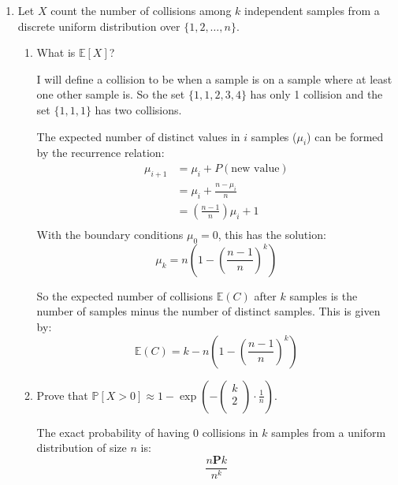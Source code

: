 \documentclass[10pt,\jkfside,a4paper]{article}
\begin{document}
\begin{enumerate}

\item Let $X$ count the number of collisions among $k$ independent samples from a discrete uniform distribution over
$\{1, 2, \ldots, n\}$.

\begin{enumerate}

\item What is $\mathbb{E}[X]$?

I will define a collision to be when a sample is on a sample where at least one other sample is.
So the set $\{1, 1, 2, 3, 4\}$ has only 1 collision and the set $\{1, 1, 1\}$ has two collisions.

The expected number of distinct values in $i$ samples ($\mu_i$) can be formed by the recurrence relation:
\[
\begin{split}
\mu_{i + 1} &= \mu_i + P(\text{new value}) \\
&= \mu_i + \frac{n - \mu_i}{n} \\
&= \left( \frac{n - 1}{n} \right)\mu_i + 1 \\
\end{split}
\]
With the boundary conditions $\mu_0 = 0$, this has the solution:
\[
\mu_k = n\left( 1 - \left(\frac{n - 1}{n}\right)^k \right)
\]

So the expected number of collisions $\mathbb{E}(C)$ after $k$ samples is the number of samples
minus the number of distinct samples. This is given by:
\[
\mathbb{E}(C) = k - n\left( 1 - \left(\frac{n - 1}{n}\right)^k \right)
\]

\item Prove that $\mathbb{P}[X > 0] \approx 1 - \exp\left( - \begin{pmatrix} k \\ 2 \\ \end{pmatrix} \cdot \frac{1}{n} \right)$.

The exact probability of having 0 collisions in $k$ samples from a uniform distribution of
size $n$ is:
\[
\frac{n\mathbf{P}k}{n^k}
\]


\end{enumerate}
\end{enumerate}
\end{document}

